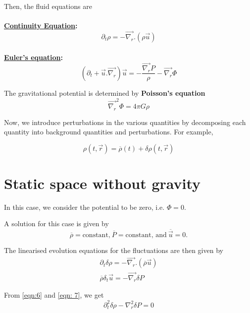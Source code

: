 \documentclass[a4,12pt,oneside]{report}
\begin{document}
   Then, the fluid equations are
   \\ \\
   {\bf\underline{Continuity Equation}:}
   \begin{equation}
   \partial_t \rho = -\overrightarrow{\nabla_r}.(\rho \vec{u})
   \end{equation}
   \\
   {\bf\underline{Euler's equation}:}
   \begin{equation}
   (\partial_t + \vec{u}.\overrightarrow{\nabla_r})\vec{u} = - \frac{\overrightarrow{\nabla_r}P}{\rho} - \overrightarrow{\nabla_r}\Phi
   \end{equation}
   
   The gravitational potential is determined by {\bf Poisson's equation}
   \begin{equation}\label{key}
   \overrightarrow{\nabla_r}^2\Phi = 4\pi G\rho
   \end{equation}
   
   Now, we introduce perturbations in the various quantities by decomposing each quantity into background quantities and perturbations. For example,
   
   \begin{equation}\label{key}
   \rho(t,\vec{r}) = \overline{\rho}(t) + \delta\rho(t,\vec{r})
   \end{equation}
   
   \section{Static space without gravity}
	In this case, we consider the potential to be zero, i.e. $ \Phi = 0 $.
	
	A solution for this case is given by
	\begin{equation}\label{key}
	\overline{\rho}=\text{constant,} \: \overline{P} = \text{constant, and} \: \overline{\vec{u}} = 0.
	\end{equation} 
	
	The linearised evolution equations for the fluctuations are then given by
	\begin{align}
	\partial_t \delta\rho = - \overrightarrow{\nabla_r}.(\overline{\rho}\vec{u}) \label{eqn:6}
	\\
	\overline{\rho}\delta_t \vec{u} = - \overrightarrow{\nabla_r}\delta P \label{eqn: 7}
	\end{align}
	
	From \eqref{eqn:6} and \eqref{eqn: 7}, we get	
	\begin{equation}\label{key}
	\partial_t^2 \delta \rho - \nabla_r^2 \delta P = 0
	\end{equation}
	
\end{document}
